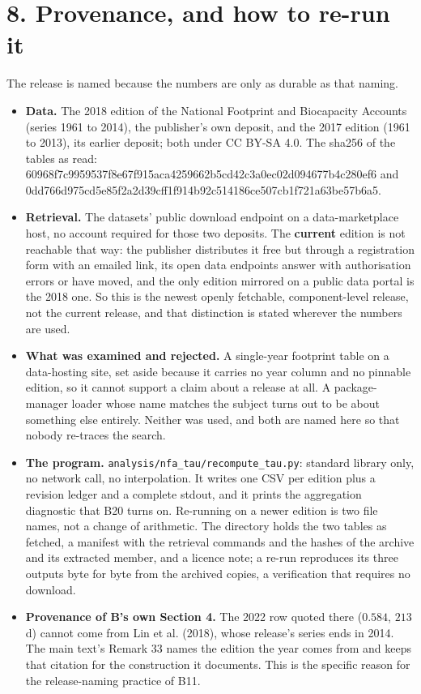 \documentclass[11pt]{article}
\begin{document}
\vspace{0.8em}

\vspace{0.8em}

\section*{8. Provenance, and how to re-run it}\label{8-provenance-and-how-to-re-run-it}

The release is named because the numbers are only as durable as that naming.

\begin{itemize}\setlength{\itemsep}{2pt}
\item \textbf{Data.} The 2018 edition of the National Footprint and Biocapacity Accounts (series 1961 to 2014), the publisher's own deposit, and the 2017 edition (1961 to 2013), its earlier deposit; both under CC BY-SA 4.0. The sha256 of the tables as read: 60968f7c9959537f8e67f915aca4259662b5cd42c3a0ec02d094677b4c280ef6 and 0dd766d975cd5e85f2a2d39cff1f914b92c514186ce507cb1f721a63be57b6a5.
\item \textbf{Retrieval.} The datasets' public download endpoint on a data-marketplace host, no account required for those two deposits. The \textbf{current} edition is not reachable that way: the publisher distributes it free but through a registration form with an emailed link, its open data endpoints answer with authorisation errors or have moved, and the only edition mirrored on a public data portal is the 2018 one. So this is the newest openly fetchable, component-level release, not the current release, and that distinction is stated wherever the numbers are used.
\item \textbf{What was examined and rejected.} A single-year footprint table on a data-hosting site, set aside because it carries no year column and no pinnable edition, so it cannot support a claim about a release at all. A package-manager loader whose name matches the subject turns out to be about something else entirely. Neither was used, and both are named here so that nobody re-traces the search.
\item \textbf{The program.} \texttt{analysis/nfa\_tau/recompute\_tau.py}: standard library only, no network call, no interpolation. It writes one CSV per edition plus a revision ledger and a complete stdout, and it prints the aggregation diagnostic that B20 turns on. Re-running on a newer edition is two file names, not a change of arithmetic. The directory holds the two tables as fetched, a manifest with the retrieval commands and the hashes of the archive and its extracted member, and a licence note; a re-run reproduces its three outputs byte for byte from the archived copies, a verification that requires no download.
\item \textbf{Provenance of B's own Section 4.} The 2022 row quoted there (\(0.584\), \(213\) d) cannot come from Lin et al. (2018), whose release's series ends in 2014. The main text's Remark 33 names the edition the year comes from and keeps that citation for the construction it documents. This is the specific reason for the release-naming practice of B11.
\end{itemize}
\end{document}

